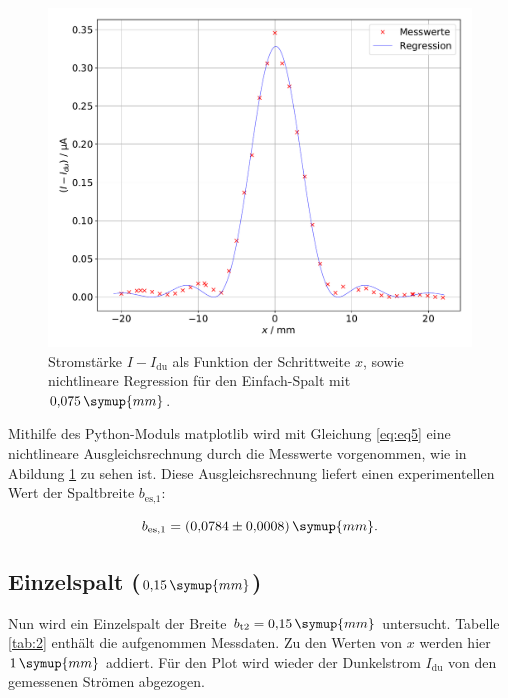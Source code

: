 \begin{figure}[h!tbp]
	\centering
	\includegraphics[width=1\linewidth]{einzel75.pdf}
	\caption{Stromstärke $I-I_{\text{du}}$ als Funktion der Schrittweite $x$, sowie nichtlineare Regression für den Einfach-Spalt mit $0{,}075\,\symup{mm}$.}
	\label{fig:es1}
\end{figure}

Mithilfe des Python-Moduls matplotlib wird mit Gleichung \ref{eq:eq5} eine nichtlineare Ausgleichsrechnung durch die Messwerte vorgenommen, wie in Abildung \ref{fig:es1} zu sehen ist.
Diese Ausgleichsrechnung liefert einen experimentellen Wert der Spaltbreite $b_{\text{es,1}}$:

\begin{equation*}
b_{\text{es,1}} = (0{,}0784\pm 0{,}0008)\,\symup{mm}.
\end{equation*}





\newpage
\subsection{Einzelspalt ($0{,}15\,\symup{mm}$)}
Nun wird ein Einzelspalt der Breite $b_{\text{t2}} = 0{,}15\,\symup{mm}$ untersucht. Tabelle \ref{tab:2} enthält die aufgenommen Messdaten. Zu den Werten von $x$ werden hier $1\,\symup{mm}$ addiert.
Für den Plot wird wieder der Dunkelstrom $I_{\text{du}}$ von den gemessenen Strömen abgezogen.


